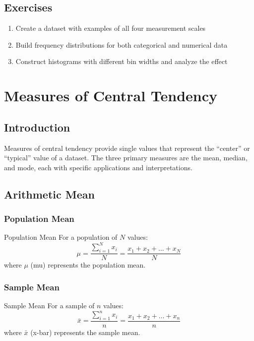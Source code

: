 \documentclass[12pt,a4paper]{book}
\begin{document}
\section{Exercises}

\begin{enumerate}
    \item Create a dataset with examples of all four measurement scales
    \item Build frequency distributions for both categorical and numerical data
    \item Construct histograms with different bin widths and analyze the effect
\end{enumerate}

\chapter{Measures of Central Tendency}

\section{Introduction}

Measures of central tendency provide single values that represent the ``center'' or ``typical'' value of a dataset. The three primary measures are the mean, median, and mode, each with specific applications and interpretations.

\section{Arithmetic Mean}

\subsection{Population Mean}

\begin{definition}{Population Mean}
For a population of $N$ values:
\[
\mu = \frac{\sum_{i=1}^{N} x_i}{N} = \frac{x_1 + x_2 + \ldots + x_N}{N}
\]
where $\mu$ (mu) represents the population mean.
\end{definition}

\subsection{Sample Mean}

\begin{definition}{Sample Mean}
For a sample of $n$ values:
\[
\bar{x} = \frac{\sum_{i=1}^{n} x_i}{n} = \frac{x_1 + x_2 + \ldots + x_n}{n}
\]
where $\bar{x}$ (x-bar) represents the sample mean.
\end{definition}
\end{document}
